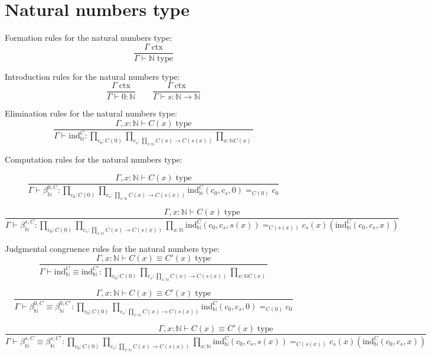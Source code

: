 \documentclass{book}
\begin{document}
\section{Natural numbers type}

Formation rules for the natural numbers type:
$$\frac{\Gamma \; \mathrm{ctx}}{\Gamma \vdash \mathbb{N} \; \mathrm{type}}$$

Introduction rules for the natural numbers type:
$$\frac{\Gamma \; \mathrm{ctx}}{\Gamma \vdash 0:\mathbb{N}} \qquad \frac{\Gamma \; \mathrm{ctx}}{\Gamma \vdash s:\mathbb{N} \to \mathbb{N}}$$

Elimination rules for the natural numbers type:
$$\frac{\Gamma, x:\mathbb{N} \vdash C(x) \; \mathrm{type}}{\Gamma \vdash \mathrm{ind}_\mathbb{N}^C:\prod_{c_0:C(0)} \prod_{c_s:\prod_{x:\mathbb{N}} C(x) \to C(s(x))} \prod_{x:\mathbb{N} C(x)}}$$

Computation rules for the natural numbers type:

$$\frac{\Gamma, x:\mathbb{N} \vdash C(x) \; \mathrm{type}}{\Gamma \vdash \beta_\mathbb{N}^{0, C}:\prod_{c_0:C(0)} \prod_{c_s:\prod_{x:\mathbb{N}} C(x) \to C(s(x))} \mathrm{ind}_\mathbb{N}^C(c_0, c_s, 0) =_{C(0)} c_0}$$

$$\frac{\Gamma, x:\mathbb{N} \vdash C(x) \; \mathrm{type}}{\Gamma \vdash \beta_\mathbb{N}^{s, C}:\prod_{c_0:C(0)} \prod_{c_s:\prod_{x:\mathbb{N}} C(x) \to C(s(x))} \prod_{x:\mathbb{N}} \mathrm{ind}_\mathbb{N}^C(c_0, c_s, s(x)) =_{C(s(x))} c_s(x)(\mathrm{ind}_\mathbb{N}^C(c_0, c_s, x))}$$

Judgmental congruence rules for the natural numbers type:
$$\frac{\Gamma, x:\mathbb{N} \vdash C(x) \equiv C'(x) \; \mathrm{type}}{\Gamma \vdash \mathrm{ind}_\mathbb{N}^C \equiv \mathrm{ind}_\mathbb{N}^{C'}:\prod_{c_0:C(0)} \prod_{c_s:\prod_{x:\mathbb{N}} C(x) \to C(s(x))} \prod_{x:\mathbb{N} C(x)}}$$

$$\frac{\Gamma, x:\mathbb{N} \vdash C(x) \equiv C'(x) \; \mathrm{type}}{\Gamma \vdash \beta_\mathbb{N}^{0, C} \equiv \beta_\mathbb{N}^{0, C'}:\prod_{c_0:C(0)} \prod_{c_s:\prod_{x:\mathbb{N}} C(x) \to C(s(x))} \mathrm{ind}_\mathbb{N}^C(c_0, c_s, 0) =_{C(0)} c_0}$$

$$\frac{\Gamma, x:\mathbb{N} \vdash C(x) \equiv C'(x) \; \mathrm{type}}{\Gamma \vdash \beta_\mathbb{N}^{s, C} \equiv \beta_\mathbb{N}^{s, C'}:\prod_{c_0:C(0)} \prod_{c_s:\prod_{x:\mathbb{N}} C(x) \to C(s(x))} \prod_{x:\mathbb{N}} \mathrm{ind}_\mathbb{N}^C(c_0, c_s, s(x)) =_{C(s(x))} c_s(x)(\mathrm{ind}_\mathbb{N}^C(c_0, c_s, x))}$$
\end{document}
